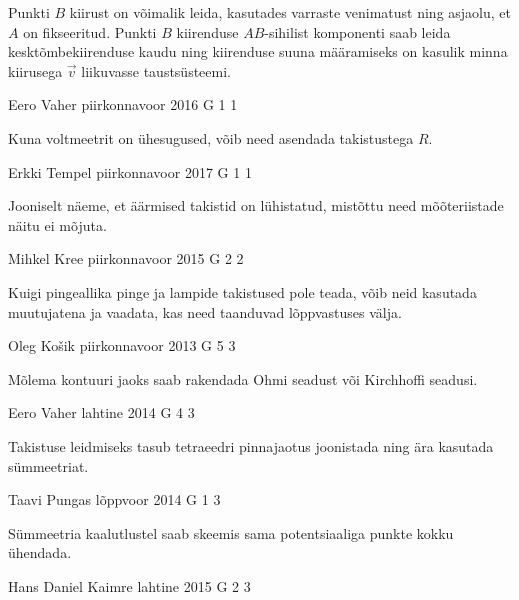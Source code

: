 \documentclass[11pt, twoside]{article}
\begin{document}
{{\ifHint
Punkti $B$ kiirust on võimalik leida, kasutades varraste venimatust ning asjaolu, et $A$ on fikseeritud. Punkti $B$ kiirenduse $AB$-sihilist komponenti saab leida kesktõmbekiirenduse kaudu ning kiirenduse suuna määramiseks on kasulik minna kiirusega $\vec{v}$ liikuvasse taustsüsteemi.
\fi
}

{Eero Vaher} %
{piirkonnavoor} %
{2016} %
{G 1} %
{1} %
{

\ifHint
Kuna voltmeetrit on ühesugused, võib need asendada takistustega $R$.
\fi
}

{Erkki Tempel} %
{piirkonnavoor} %
{2017} %
{G 1} %
{1} %
{

\ifHint
Jooniselt näeme, et äärmised takistid on lühistatud, mistõttu need mõõteriistade näitu ei mõjuta.
\fi
}

{Mihkel Kree} %
{piirkonnavoor} %
{2015} %
{G 2} %
{2} %
{

\ifHint
Kuigi pingeallika pinge ja lampide takistused pole teada, võib neid kasutada muutujatena ja vaadata, kas need taanduvad lõppvastuses välja.
\fi
}

{Oleg Košik} %
{piirkonnavoor} %
{2013} %
{G 5} %
{3} %
{

\ifHint
Mõlema kontuuri jaoks saab rakendada Ohmi seadust või Kirchhoffi seadusi.
\fi
}

{Eero Vaher} %
{lahtine} %
{2014} %
{G 4} %
{3} %
{

\ifHint
Takistuse leidmiseks tasub tetraeedri pinnajaotus joonistada ning ära kasutada sümmeetriat.
\fi
}

{Taavi Pungas} %
{lõppvoor} %
{2014} %
{G 1} %
{3} %
{

\ifHint
Sümmeetria kaalutlustel saab skeemis sama potentsiaaliga punkte kokku ühendada.
\fi
}

{Hans Daniel Kaimre} %
{lahtine} %
{2015} %
{G 2} %
{3} %
{

}}
\end{document}

